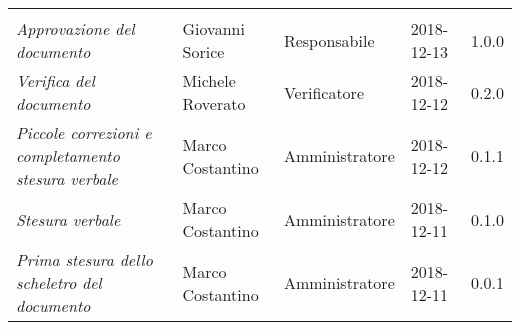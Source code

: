 \newpage 
\section*{}
\begin{table}[H]
	\centering
	\begin{tabular}{p{4cm}|C{3cm}|C{3cm}|R{2.5cm}|R{2cm}}
		
		 & & & & \\
		
		
		\emph{Approvazione del documento} & Giovanni Sorice & Responsabile & 2018-12-13 & 1.0.0 \\
		\hline
		
		\emph{Verifica del documento} & Michele Roverato & Verificatore & 2018-12-12 & 0.2.0 \\
		\hline

		\emph{Piccole correzioni e completamento stesura verbale} & Marco Costantino & Amministratore & 2018-12-12 & 0.1.1 \\
		\hline

		\emph{Stesura verbale} & Marco Costantino & Amministratore & 2018-12-11 & 0.1.0 \\
		\hline
		
		\emph{Prima stesura dello scheletro del documento} & Marco Costantino & Amministratore & 2018-12-11 & 0.0.1 \\
		
	\end{tabular}
	
\end{table}


\clearpage